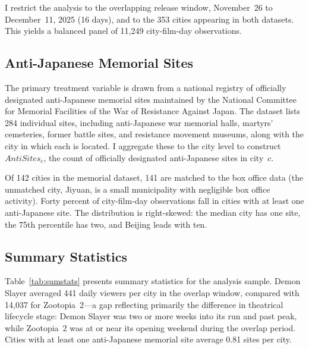 \documentclass[12pt]{article}
\begin{document}
I restrict the analysis to the overlapping release window, November~26 to December~11, 2025 (16 days), and to the 353 cities appearing in both datasets. This yields a balanced panel of 11,249 city-film-day observations.

\subsection{Anti-Japanese Memorial Sites}

The primary treatment variable is drawn from a national registry of officially designated anti-Japanese memorial sites maintained by the National Committee for Memorial Facilities of the War of Resistance Against Japan. The dataset lists 284 individual sites, including anti-Japanese war memorial halls, martyrs' cemeteries, former battle sites, and resistance movement museums, along with the city in which each is located. I aggregate these to the city level to construct $\textit{AntiSites}_{c}$, the count of officially designated anti-Japanese sites in city~$c$.

Of 142 cities in the memorial dataset, 141 are matched to the box office data (the unmatched city, Jiyuan, is a small municipality with negligible box office activity). Forty percent of city-film-day observations fall in cities with at least one anti-Japanese site. The distribution is right-skewed: the median city has one site, the 75th percentile has two, and Beijing leads with ten.

\subsection{Summary Statistics}

Table~\ref{tab:sumstats} presents summary statistics for the analysis sample. Demon Slayer averaged 441 daily viewers per city in the overlap window, compared with 14,037 for Zootopia~2---a gap reflecting primarily the difference in theatrical lifecycle stage: Demon Slayer was two or more weeks into its run and past peak, while Zootopia~2 was at or near its opening weekend during the overlap period. Cities with at least one anti-Japanese memorial site average 0.81 sites per city.
\end{document}
